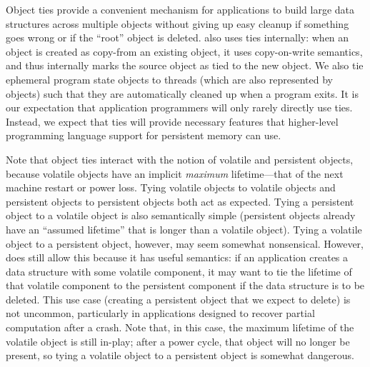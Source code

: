 {    Object ties provide a convenient mechanism for applications to build large data structures across
    multiple objects without giving up easy cleanup if something goes wrong or if the ``root'' object is
    deleted. \Twizzler also uses ties internally: when an object is created as copy-from an existing
    object, it uses copy-on-write semantics, and thus internally marks the source object as tied to the
    new object. We also tie ephemeral program state objects to threads (which are also represented by
    objects) such that they are automatically cleaned up when a program exits. It is our expectation
    that application programmers will only rarely directly use ties. Instead, we expect that ties will
    provide necessary features that higher-level programming language support for persistent memory can
    use.

    Note that object ties interact with the notion of volatile and persistent objects, because
    volatile objects have an implicit \emph{maximum} lifetime---that of the next machine restart or
    power loss. Tying volatile objects to volatile objects and persistent objects to persistent objects both act as
    expected. Tying a persistent object to a volatile object is also semantically simple (persistent
    objects already have an ``assumed lifetime'' that is longer than a volatile object). Tying a
    volatile object to a persistent object, however, may seem somewhat nonsensical. However, \Twizzler
    does still allow this because it has useful semantics: if an application creates a data structure
    with some volatile component,
    it may want to tie the lifetime of that volatile component to the
    persistent component if the data structure is to be deleted. This use case (creating a persistent
    object that we expect to delete) is not uncommon, particularly in applications designed to recover
    partial computation after a crash. Note that, in this case, the maximum
    lifetime of the volatile object is still in-play; after a power cycle, that object will no longer be
    present, so tying a volatile object to a persistent object is somewhat dangerous.

}


